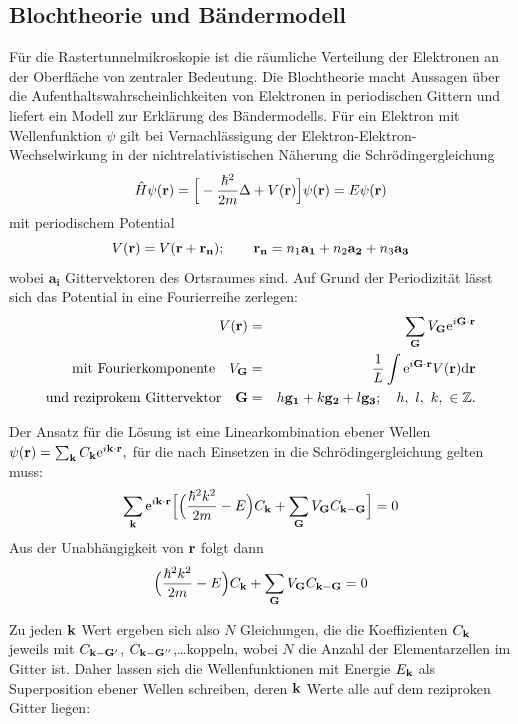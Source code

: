 \subsection{Blochtheorie und Bändermodell}

Für die Rastertunnelmikroskopie ist die räumliche Verteilung der Elektronen an 
der Oberfläche von zentraler Bedeutung. Die Blochtheorie macht Aussagen über 
die Aufenthaltswahrscheinlichkeiten von Elektronen in periodischen 
Gittern und liefert ein Modell zur Erklärung des Bändermodells. 
Für ein Elektron mit Wellenfunktion $\psi$ gilt bei Vernachlässigung der 
Elektron-Elektron-Wechselwirkung in der nichtrelativistischen Näherung die 
Schrödingergleichung 
\begin{equation}
    \hat H \psi(\mathbf{r}) = \Big[ - \frac{\hbar^2}{2m} \Delta + V(\mathbf{r}) \Big] \psi(\mathbf{r}) = E \psi(\mathbf{r})
\end{equation}
mit periodischem Potential
\begin{equation}
    V(\mathbf{r}) = V(\mathbf{r + r_n}); 
\qquad \mathbf{r_n} = n_1 \mathbf{a_1} + n_2 \mathbf{a_2} + n_3 \mathbf{a_3} 
\end{equation}
wobei $\mathbf{a_i}$ Gittervektoren des Ortsraumes sind. Auf Grund der Periodizität lässt 
sich das Potential in eine Fourierreihe zerlegen:
\begin{eqnarray}
    V(\mathbf{r}) &= &\sum_{\mathbf{G}} V_{\mathbf{G}} \mathrm{e}^{i\mathbf{G} \cdot \mathbf{r}} \\
    \mathrm{mit \ Fourierkomponente \quad}  V_{\mathbf{G}} &= &\frac{1}{L} \int \mathrm{e}^{i\mathbf{G} \cdot \mathbf{r}} 
    V(\mathbf{r}) \mathrm{d}\mathbf{r}  \nonumber \\
    \mathrm{und \ reziprokem \ Gittervektor \quad} \mathbf{G} &= &h\mathbf{g_1} + k\mathbf{g_2} +l\mathbf{g_3}; 
    \quad h, \ l, \ k, \ \in \mathbb{Z}. \nonumber
\end{eqnarray}

Der Ansatz für die Lösung ist eine Linearkombination ebener Wellen
$ \psi(\mathbf{r}) = \sum_{\mathbf{k}} C_{\mathbf{k}} \mathrm{e}^{i\mathbf{k} \cdot \mathbf{r}}, $
für die nach Einsetzen in die Schrödingergleichung gelten muss:
\begin{equation}
    \sum_{\mathbf{k}} \mathrm{e}^{i\mathbf{k} \cdot \mathbf{r}} 
    \Big[ \Big( \frac{\hbar^2 k^2}{2m} - E\Big) C_{\mathbf{k}} + \sum_{\mathbf{G}} V_{\mathbf{G}} C_{\mathbf{k} - \mathbf{G}}\Big] 
    = 0
\end{equation}
Aus der Unabhängigkeit von $\mathbf{r}$ folgt dann
\begin{equation}
    \Big( \frac{\hbar^2 k^2}{2m} - E\Big) C_{\mathbf{k}} + \sum_{\mathbf{G}} V_{\mathbf{G}} C_{\mathbf{k} - \mathbf{G}}= 0
\end{equation}

Zu jeden $\mathbf{k}$ Wert ergeben sich also $N$ Gleichungen, die die Koeffizienten
$C_{\mathbf{k}}$ jeweils mit $C_{\mathbf{k} - \mathbf{G}'}$, $C_{\mathbf{k} - \mathbf{G}''}$,\ldots  koppeln, wobei $N$ die Anzahl 
der Elementarzellen im Gitter ist. Daher lassen sich die Wellenfunktionen 
mit Energie $E_{\mathbf{k}}$ als Superposition ebener Wellen schreiben, deren $\mathbf{k}$ Werte 
alle auf dem reziproken Gitter liegen: 

